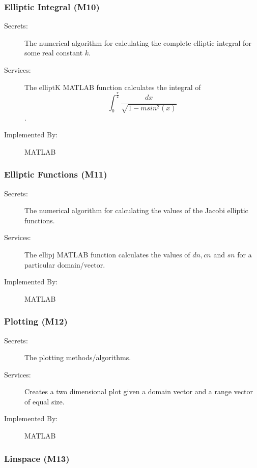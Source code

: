 \documentclass[12pt, titlepage]{article}
\begin{document}
	\subsubsection{Elliptic Integral (M10)} 
	
	\begin{description}
		\item[Secrets:] The numerical algorithm for calculating the complete 
		elliptic integral for some real constant $k$. 
		\item[Services:] The elliptK MATLAB function calculates the integral of 
		$$ 
		\int_{0}^{\frac{\pi}{2}} \frac{dx}{\sqrt{1-msin^{2}(x)}}$$. \\ 
		\item[Implemented By:] MATLAB
	\end{description} 
	
	\subsubsection{Elliptic Functions (M11)} 
	
	\begin{description}
		\item[Secrets:] The numerical algorithm for calculating the values of 
		the 
		Jacobi elliptic functions. 
		\item[Services:] The ellipj MATLAB function calculates the values of 
		$dn,cn$ 
		and $sn$ for a particular domain/vector. 
		\item[Implemented By:] MATLAB
	\end{description} 
	
	\subsubsection{Plotting (M12)} 
	
	\begin{description}
		\item[Secrets:] The plotting methods/algorithms.
		\item[Services:] Creates a two dimensional plot given a domain vector 
		and a 
		range vector of equal size.  
		\item[Implemented By:] MATLAB
	\end{description} 
	
	\subsubsection{Linspace (M13)} 
	
\end{document}
